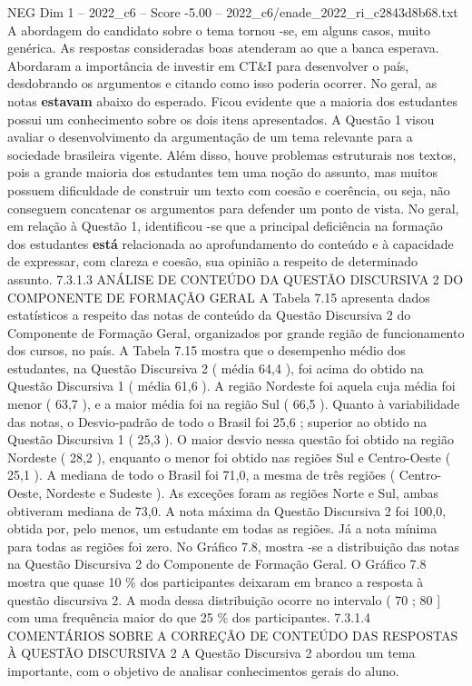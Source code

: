 \begin{textsample}{NEG Dim 1 – 2022\_c6 – Score -5.00 – 2022\_c6/enade\_2022\_ri\_c2843d8b68.txt}
A abordagem do candidato sobre o tema tornou -se, em alguns casos, muito genérica.
As respostas consideradas boas atenderam ao que a banca esperava.
Abordaram a importância de investir em CT\&I para desenvolver o país, desdobrando os argumentos e citando como isso poderia ocorrer.
No geral, as notas \textbf{estavam} abaixo do esperado.
Ficou evidente que a maioria dos estudantes possui um conhecimento sobre os dois itens apresentados.
A Questão 1 visou avaliar o desenvolvimento da argumentação de um tema relevante para a sociedade brasileira vigente.
Além disso, houve problemas estruturais nos textos, pois a grande maioria dos estudantes tem uma noção do assunto, mas muitos possuem dificuldade de construir um texto com coesão e coerência, ou seja, não conseguem concatenar os argumentos para defender um ponto de vista.
No geral, em relação à Questão 1, identificou -se que a principal deficiência na formação dos estudantes \textbf{está} relacionada ao aprofundamento do conteúdo e à capacidade de expressar, com clareza e coesão, sua opinião a respeito de determinado assunto. 7.3.1.3 ANÁLISE DE CONTEÚDO DA QUESTÃO DISCURSIVA 2 DO COMPONENTE DE FORMAÇÃO GERAL A Tabela 7.15 apresenta dados estatísticos a respeito das notas de conteúdo da Questão Discursiva 2 do Componente de Formação Geral, organizados por grande região de funcionamento dos cursos, no país.
A Tabela 7.15 mostra que o desempenho médio dos estudantes, na Questão Discursiva 2 ( média 64,4 ), foi acima do obtido na Questão Discursiva 1 ( média 61,6 ).
A região Nordeste foi aquela cuja média foi menor ( 63,7 ), e a maior média foi na região Sul ( 66,5 ).
Quanto à variabilidade das notas, o Desvio-padrão de todo o Brasil foi 25,6 ; superior ao obtido na Questão Discursiva 1 ( 25,3 ).
O maior desvio nessa questão foi obtido na região Nordeste ( 28,2 ), enquanto o menor foi obtido nas regiões Sul e Centro-Oeste ( 25,1 ).
A mediana de todo o Brasil foi 71,0, a mesma de três regiões ( Centro-Oeste, Nordeste e Sudeste ).
As exceções foram as regiões Norte e Sul, ambas obtiveram mediana de 73,0.
A nota máxima da Questão Discursiva 2 foi 100,0, obtida por, pelo menos, um estudante em todas as regiões.
Já a nota mínima para todas as regiões foi zero.
No Gráfico 7.8, mostra -se a distribuição das notas na Questão Discursiva 2 do Componente de Formação Geral.
O Gráfico 7.8 mostra que quase 10 \% dos participantes deixaram em branco a resposta à questão discursiva 2.
A moda dessa distribuição ocorre no intervalo ( 70 ; 80 ] com uma frequência maior do que 25 \% dos participantes. 7.3.1.4 COMENTÁRIOS SOBRE A CORREÇÃO DE CONTEÚDO DAS RESPOSTAS À QUESTÃO DISCURSIVA 2 A Questão Discursiva 2 abordou um tema importante, com o objetivo de analisar conhecimentos gerais do aluno.

\end{textsample}
